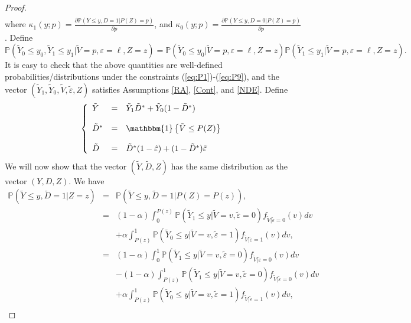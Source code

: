 \documentclass[11pt,reqno]{amsart}
\theoremstyle{plain}
\numberwithin{equation}{section}
\begin{document}
\begin{proof}
\begin{eqnarray*}
\end{eqnarray*}
where $\kappa_1(y;p)=\frac{\partial \mathbb P(Y\leq y, D=1 \vert P(Z)=p)}{\partial p}$, and $\kappa_0(y;p)=\frac{\partial \mathbb P(Y\leq y, D=0 \vert P(Z)=p) }{\partial p}$.
Define $$\mathbb P(\tilde{Y}_0 \leq y_0, \tilde{Y}_1 \leq y_1 \vert \tilde{V}=p,\varepsilon=\ell, Z=z)=\mathbb P(\tilde{Y}_0 \leq y_0 \vert \tilde{V}=p,\varepsilon=\ell, Z=z)\mathbb P(\tilde{Y}_1 \leq y_1 \vert \tilde{V}=p,\varepsilon=\ell, Z=z).$$ 
It is easy to check that the above quantities are well-defined probabilities/distributions under the constraints (\ref{eq:P1})-(\ref{eq:P9}), and the vector $\left(\tilde{Y}_1, \tilde{Y}_0, \tilde{V}, \tilde{\varepsilon}, Z\right)$ satisfies Assumptions \ref{RA}, \ref{Cont}, and \ref{NDE}.
Define
\begin{eqnarray}\label{seq2}
\left\{ \begin{array}{lcl}
     \tilde{Y}&=&\tilde{Y}_1\tilde{D}^*+\tilde{Y}_0(1-\tilde{D}^*)\\ \\
     \tilde{D}^*&=&\mathbbm{1}\left\{\tilde{V}\leq P(Z)\right\}\\ \\
     \tilde{D}&=&\tilde{D}^* (1-\tilde{\varepsilon}) +(1-\tilde{D}^*) \tilde{\varepsilon}
     \end{array} \right.
\end{eqnarray}
We will now show that the vector $\left(\tilde{Y}, \tilde{D}, Z \right)$ has the same distribution as the vector $(Y,D,Z)$. %
We have
\begin{eqnarray*}
\mathbb P(\tilde{Y}\leq y, \tilde{D}=1 \vert Z=z) &=&\mathbb P(\tilde{Y}\leq y, \tilde{D}=1 \vert P(Z)=P(z)),\\
&=& (1-\alpha) \int^{P(z)}_0\mathbb P\left(\tilde{Y}_1\leq y \vert \tilde{V}=v, \tilde{\varepsilon} =0\right)f_{\tilde{V}\vert \tilde{\varepsilon}=0}(v)dv\\
&& + \alpha \int_{P(z)}^1\mathbb P\left(\tilde{Y}_0\leq y \vert \tilde{V}=v, \tilde{\varepsilon} =1\right)f_{\tilde{V}\vert \tilde{\varepsilon}=1}(v)dv,\\
&=& (1-\alpha) \int^{1}_0 \mathbb P\left(\tilde{Y}_1\leq y \vert \tilde{V}=v, \tilde{\varepsilon} =0\right)f_{\tilde{V}\vert \tilde{\varepsilon}=0}(v)dv\\
&& -(1-\alpha) \int^{1}_{P(z)} \mathbb P\left(\tilde{Y}_1\leq y \vert \tilde{V}=v, \tilde{\varepsilon} =0\right)f_{\tilde{V}\vert \tilde{\varepsilon}=0}(v)dv\\
&& + \alpha \int_{P(z)}^1\mathbb P\left(\tilde{Y}_0\leq y \vert \tilde{V}=v, \tilde{\varepsilon} =1\right)f_{\tilde{V}\vert \tilde{\varepsilon}=1}(v)dv,\\

\end{eqnarray*}
\end{proof}
\end{document}
